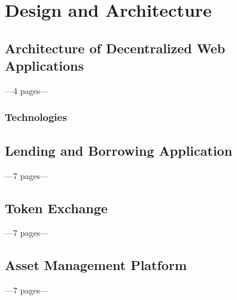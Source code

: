 \chapter{Design and Architecture}
\label{cha:DesignArchitecture}

\section{Architecture of Decentralized Web Applications}
---4 pages---
\subsection{Technologies}

\section{Lending and Borrowing Application}
---7 pages---

\section{Token Exchange}
---7 pages---

\section{Asset Management Platform}
---7 pages---